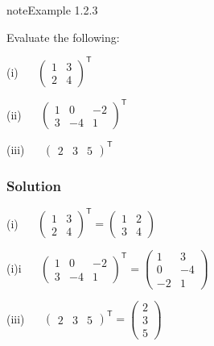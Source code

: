 \documentclass[letterpaper,10pt,english]{jupyterBook}
\begin{document}
\begin{sphinxadmonition}{note}{Example 1.2.3}



\sphinxAtStartPar
Evaluate the following:

\sphinxAtStartPar
(i)   \(\begin{pmatrix} 1 & 3 \\ 2 & 4 \end{pmatrix}^\mathsf{T}\)

\sphinxAtStartPar
(ii)   \(\begin{pmatrix} 1 & 0 & -2 \\ 3 & -4 & 1 \end{pmatrix}^\mathsf{T}\)

\sphinxAtStartPar
(iii)   \(\begin{pmatrix}2 & 3 & 5 \end{pmatrix}^\mathsf{T}\)
\subsubsection*{Solution}

\sphinxAtStartPar
(i)   \( \begin{pmatrix} 1 & 3 \\ 2 & 4 \end{pmatrix}^\mathsf{T} = \begin{pmatrix} 1 & 2 \\ 3 & 4 \end{pmatrix} \)

\sphinxAtStartPar
(i)i   \( \begin{pmatrix} 1 & 0 & -2 \\ 3 & -4 & 1 \end{pmatrix}^\mathsf{T} = \begin{pmatrix} 1 & 3 \\ 0 & -4 \\ -2 & 1 \end{pmatrix} \)

\sphinxAtStartPar
(iii)   \( \begin{pmatrix}2 & 3 & 5 \end{pmatrix}^\mathsf{T} = \begin{pmatrix} 2 \\ 3 \\ 5 \end{pmatrix} \)
\end{sphinxadmonition}

\sphinxstepscope

\ignorespaces 
\end{document}
